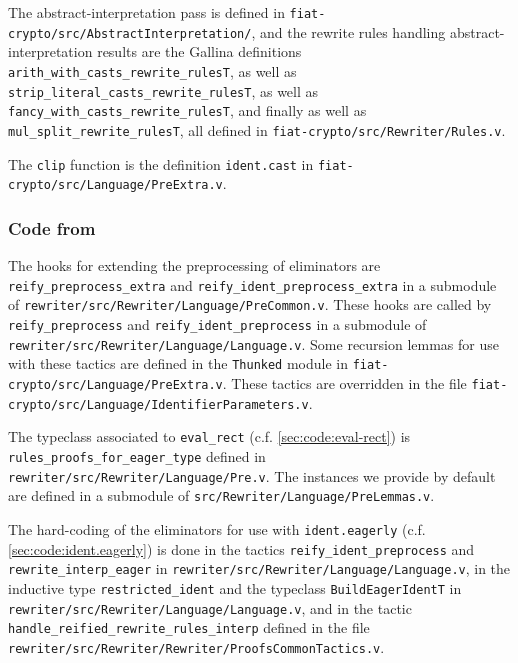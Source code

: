 \begin{subappendices}
The abstract-interpretation pass is defined in \texttt{fiat-crypto/src/AbstractInterpretation/}, and the rewrite rules handling abstract-interpretation results are the Gallina definitions \verb|arith_with_casts_rewrite_rulesT|, as well as \verb|strip_literal_casts_rewrite_rulesT|, as well as \verb|fancy_with_casts_rewrite_rulesT|, and finally as well as \verb|mul_split_rewrite_rulesT|, all defined in \texttt{fiat-crypto/src/Rewriter/Rules.v}.

The \verb|clip| function is the definition \verb|ident.cast| in \texttt{fiat-crypto/src/Language/PreExtra.v}.

\subsubsection{Code from }\label{sec:code-from-implementation-and-usage}

The \Ltac{} hooks for extending the preprocessing of eliminators are \texttt{reify_preprocess_extra} and \texttt{reify_ident_preprocess_extra} in a submodule of \texttt{rewriter/src/Rewriter/Language/PreCommon.v}.
These hooks are called by \texttt{reify_preprocess} and \texttt{reify_ident_preprocess} in a submodule of \texttt{rewriter/src/Rewriter/Language/Language.v}.
Some recursion lemmas for use with these tactics are defined in the \verb|Thunked| module in \texttt{fiat-crypto/src/Language/PreExtra.v}.
These tactics are overridden in the file \texttt{fiat-crypto/src/Language/IdentifierParameters.v}.

The typeclass associated to \texttt{eval_rect} ({c.f.} \autoref{sec:code:eval-rect}) is \texttt{rules_proofs_for_eager_type} defined in \texttt{rewriter/src/Rewriter/Language/Pre.v}.
The instances we provide by default are defined in a submodule of \texttt{src/Rewriter/Language/PreLemmas.v}.

The hard-coding of the eliminators for use with \texttt{ident.eagerly} ({c.f.} \autoref{sec:code:ident.eagerly}) is done in the tactics \texttt{reify_ident_preprocess} and \texttt{rewrite_interp_eager} in \texttt{rewriter/src/Rewriter/Language/Language.v}, in the inductive type \texttt{restricted_ident} and the typeclass \texttt{BuildEagerIdentT} in \texttt{rewriter/src/Rewriter/Language/Language.v}, and in the \Ltac{} tactic \texttt{handle_reified_rewrite_rules_interp} defined in the file \texttt{rewriter/src/Rewriter/Rewriter/ProofsCommonTactics.v}.


\end{subappendices}
